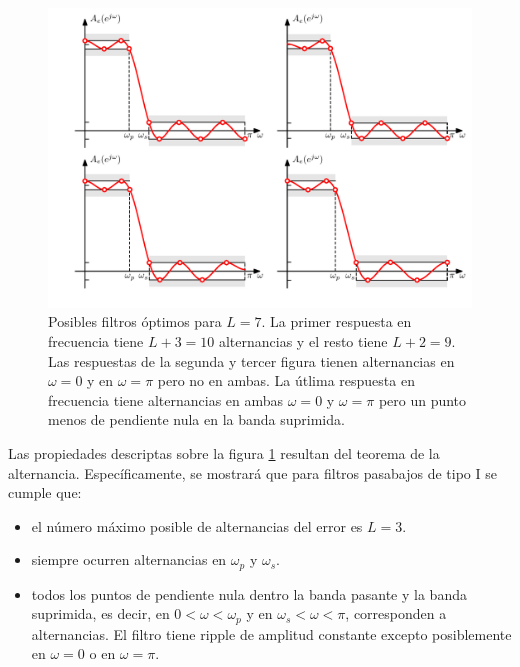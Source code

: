 \documentclass[a4paper]{report}
\begin{document}
\begin{figure}[!htb]
 \begin{center}
 \includegraphics[width=1\textwidth]{figuras/filter_design_fir_optimal_pm_alternation_theorem_alternations.pdf}
 \caption{\label{fig:filter_design_fir_optimal_pm_alternation_theorem_alternations} Posibles filtros óptimos para \(L=7\). La primer respuesta en frecuencia tiene \(L+3=10\) alternancias y el resto tiene \(L+2=9\). Las respuestas de la segunda y tercer figura tienen alternancias en \(\omega=0\) y en \(\omega=\pi\) pero no en ambas. La útlima respuesta en frecuencia tiene alternancias en ambas \(\omega=0\) y \(\omega=\pi\) pero un punto menos de pendiente nula en la banda suprimida.}
 \end{center}
\end{figure}

Las propiedades descriptas sobre la figura \ref{fig:filter_design_fir_optimal_pm_alternation_theorem_alternations} resultan del teorema de la alternancia. Específicamente, se mostrará que para filtros pasabajos de tipo I se cumple que: 
\begin{itemize}
 \item el número máximo posible de alternancias del error es \(L=3\).
 \item siempre ocurren alternancias en \(\omega_p\) y \(\omega_s\).
 \item todos los puntos de pendiente nula dentro la banda pasante y la banda suprimida, es decir, en \(0<\omega<\omega_p\) y en \(\omega_s<\omega<\pi\), corresponden a alternancias. El filtro tiene ripple de amplitud constante excepto posiblemente en \(\omega=0\) o en \(\omega=\pi\).
\end{itemize}
\end{document}
